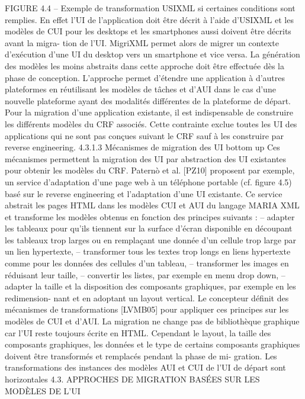 \documentclass{article}
\begin{document}
 
 
FIGURE 4.4 – Exemple de transformation USIXML
si certaines conditions sont remplies. En effet l’UI de l’application doit être décrit à l’aide d’USIXML
et les modèles de CUI pour les desktops et les smartphones aussi doivent être décrits avant la migra-
tion de l’UI. MigriXML permet alors de migrer un contexte d’exécution d’une UI du desktop vers un
smartphone et vice versa.
La génération des modèles les moins abstraits dans cette approche doit être effectuée dès la phase
de conception. L’approche permet d’étendre une application à d’autres plateformes en réutilisant les
modèles de tâches et d’AUI dans le cas d’une nouvelle plateforme ayant des modalités différentes de la
plateforme de départ. Pour la migration d’une application existante, il est indispensable de construire
les différents modèles du CRF associés. Cette contrainte exclue toutes les UI des applications qui ne
sont pas conçues suivant le CRF sauf à les construire par reverse engineering.
4.3.1.3
Mécanismes de migration des UI bottom up
Ces mécanismes permettent la migration des UI par abstraction des UI existantes pour obtenir les
modèles du CRF. Paternò et al. [PZ10] proposent par exemple, un service d’adaptation d’une page
web à un téléphone portable (cf. ﬁgure 4.5) basé sur le reverse engineering et l’adaptation d’une UI
existante. Ce service abstrait les pages HTML dans les modèles CUI et AUI du langage MARIA XML
et transforme les modèles obtenus en fonction des principes suivants :
– adapter les tableaux pour qu’ils tiennent sur la surface d’écran disponible en découpant les
tableaux trop larges ou en remplaçant une donnée d’un cellule trop large par un lien hypertexte,
– transformer tous les textes trop longs en liens hypertexte comme pour les données des cellules
d’un tableau,
– transformer les images en réduisant leur taille,
– convertir les listes, par exemple en menu drop down,
– adapter la taille et la disposition des composants graphiques, par exemple en les redimension-
nant et en adoptant un layout vertical.
Le concepteur déﬁnit des mécanismes de transformations [LVMB05] pour appliquer ces principes
sur les modèles de CUI et d’AUI. La migration ne change pas de bibliothèque graphique car l’UI reste
toujours écrite en HTML. Cependant le layout, la taille des composants graphiques, les données et le
type de certains composants graphiques doivent être transformés et remplacés pendant la phase de mi-
gration. Les transformations des instances des modèles AUI et CUI de l’UI de départ sont horizontales
4.3. APPROCHES DE MIGRATION BASÉES SUR LES MODÈLES DE L’UI
\end{document}
